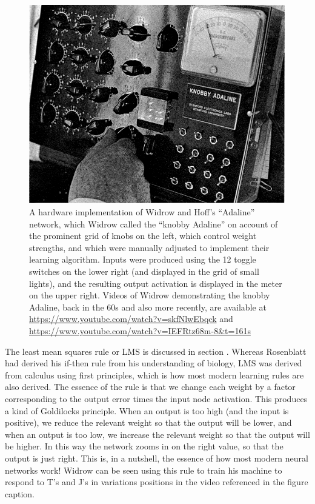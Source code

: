 \begin{figure}[h]
\centering
\includegraphics[scale=.3]{./images/adaline.png}
\caption[From \cite{widrow1963adaline}.]{A hardware implementation of Widrow and Hoff's ``Adaline'' network, which Widrow called the ``knobby Adaline'' on account of the prominent grid of knobs on the left, which control weight strengths, and which were manually adjusted to implement their learning algorithm. Inputs were produced using the 12 toggle switches on the lower right (and displayed in the grid of small lights), and the resulting output activation is displayed in the meter on the upper right. Videos of Widrow demonstrating the knobby Adaline, back in the 60s and also more recently, are available at \url{https://www.youtube.com/watch?v=skfNlwEbqck} and \url{https://www.youtube.com/watch?v=IEFRtz68m-8&t=161s}}
\label{adaline}
\end{figure}

The least mean squares rule or LMS is discussed in section . Whereas Rosenblatt had derived his if-then rule from his understanding of biology, LMS was derived from calculus using first principles, which is how most modern learning rules are also derived. The essence of the rule is that we change each weight by a factor corresponding to the output error times the input node activation. This produces a kind of Goldilocks principle. When an output is too high (and the input is positive), we reduce the relevant weight so that the output will be lower, and  when an output is too low, we increase the relevant weight so that the output will be higher. In this way the network zooms in on the right value, so that the output is just right. This is, in a nutshell, the essence of how most modern neural networks work!  Widrow can be seen using this rule to train his machine to respond to T's and J's in variations positions in the video referenced in the figure caption. 

